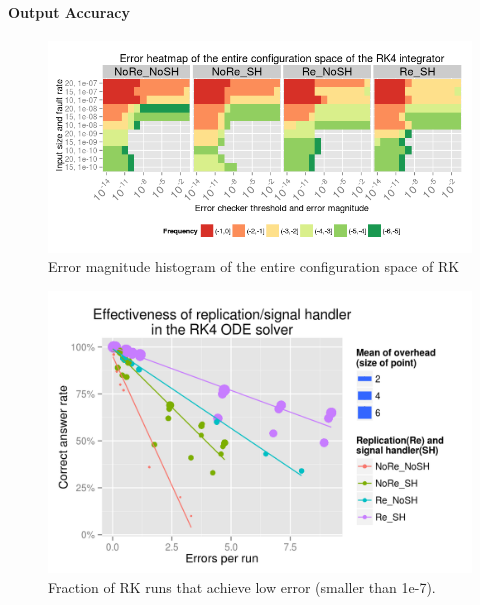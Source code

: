\documentclass{sig-alternate}
\begin{document}
\paragraph{Output Accuracy}

\begin{figure}[ht!]
\centering
\includegraphics[width=1.00\columnwidth]{figs/4_1_1_Exp2_2_Heatmap_Error_ConfSpace_RK4.png}
\caption{Error magnitude histogram of the entire configuration space of RK}
\label{fig:rt_algo_err_heatmap}
\end{figure}

\begin{figure}[ht!]
\centering
\includegraphics[width=1.00\columnwidth]{figs/4_1_2_Exp2_Effectiveness.png}
\caption{Fraction of RK runs that achieve low error (smaller than 1e-7).}
\label{fig:rk_effectiveness}
\end{figure}
\end{document}
